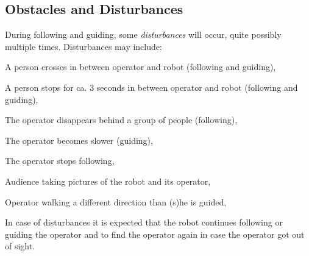 \subsection{Obstacles and Disturbances}
During following and guiding, some \emph{disturbances} will occur, quite possibly multiple times. 
Disturbances may include:
\begin{compactitem}
\item A person crosses in between operator and robot (following and guiding), 
\item A person stops for ca. 3 seconds in between operator and robot (following and guiding), 
\item The operator disappears behind a group of people (following),
\item The operator becomes slower (guiding),
\item The operator stops following,
\item Audience taking pictures of the robot and its operator,
\item Operator walking a different direction than (s)he is guided,
\end{compactitem}
In case of disturbances it is expected that the robot continues following or guiding the operator and to find the operator again in case the operator got out of sight.

